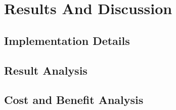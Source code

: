 \chapter{Results And Discussion}

\section{Implementation Details }

\section{Result Analysis}

\section{Cost and Benefit Analysis}
